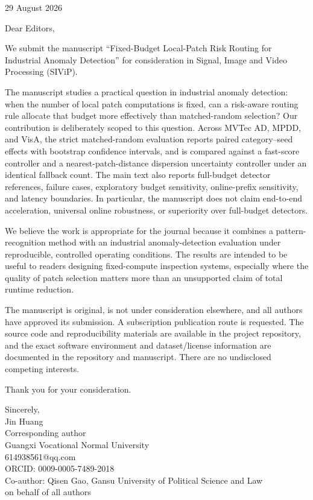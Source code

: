 \documentclass[11pt]{article}
\begin{document}
\onehalfspacing

\begin{flushright}
29 August 2026
\end{flushright}

Dear Editors,

We submit the manuscript ``Fixed-Budget Local-Patch Risk Routing for Industrial Anomaly Detection'' for consideration in Signal, Image and Video Processing (SIViP).

The manuscript studies a practical question in industrial anomaly detection: when the number of local patch computations is fixed, can a risk-aware routing rule allocate that budget more effectively than matched-random selection? Our contribution is deliberately scoped to this question. Across MVTec AD, MPDD, and VisA, the strict matched-random evaluation reports paired category--seed effects with bootstrap confidence intervals, and is compared against a fast-score controller and a nearest-patch-distance dispersion uncertainty controller under an identical fallback count. The main text also reports full-budget detector references, failure cases, exploratory budget sensitivity, online-prefix sensitivity, and latency boundaries. In particular, the manuscript does not claim end-to-end acceleration, universal online robustness, or superiority over full-budget detectors.

We believe the work is appropriate for the journal because it combines a pattern-recognition method with an industrial anomaly-detection evaluation under reproducible, controlled operating conditions. The results are intended to be useful to readers designing fixed-compute inspection systems, especially where the quality of patch selection matters more than an unsupported claim of total runtime reduction.

The manuscript is original, is not under consideration elsewhere, and all authors have approved its submission. A subscription publication route is requested. The source code and reproducibility materials are available in the project repository, and the exact software environment and dataset/license information are documented in the repository and manuscript. There are no undisclosed competing interests.

Thank you for your consideration.

Sincerely,\\[6pt]
Jin Huang\\
Corresponding author\\
Guangxi Vocational Normal University\\
614938561@qq.com\\
ORCID: 0009-0005-7489-2018\\
Co-author: Qisen Gao, Gansu University of Political Science and Law\\
on behalf of all authors
\end{document}
